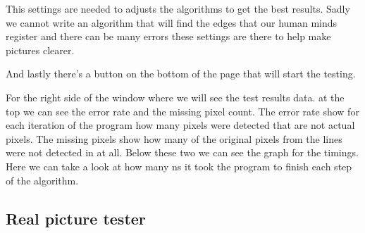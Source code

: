 This settings are needed to adjusts the algorithms to get the best results. Sadly we cannot write an algorithm that will find the edges that our human minds register and there can be many errors these settings are there to help make pictures clearer.

And lastly there's a button on the bottom of the page that will start the testing.

For the right side of the window where we will see the test results data. at the top we can see the error rate and the missing pixel count. The error rate show for each iteration of the program how many pixels were detected that are not actual pixels. The missing pixels show how many of the original pixels from the lines were not detected in at all. Below these two we can see the graph for the timings. Here we can take a look at how many \ac{ns} it took the program to finish each step of the algorithm.

\subsection{Real picture tester}




